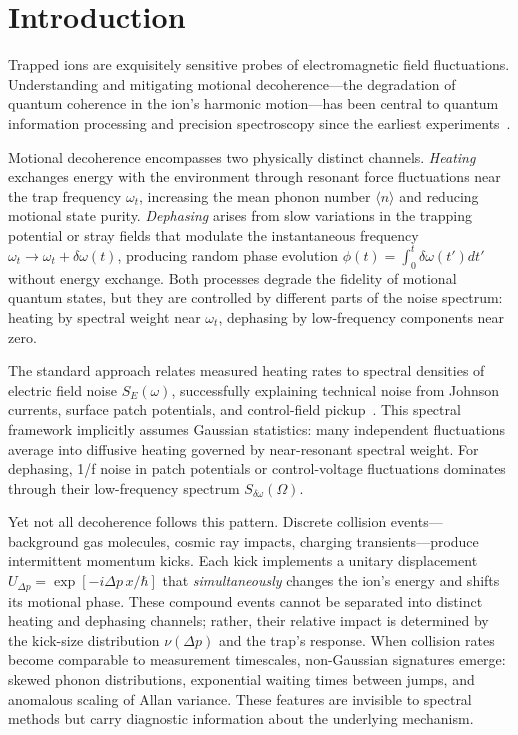\section{Introduction}

Trapped ions are exquisitely sensitive probes of electromagnetic field fluctuations. Understanding and mitigating motional decoherence—the degradation of quantum coherence in the ion's harmonic motion—has been central to quantum information processing and precision spectroscopy since the earliest experiments~\cite{Turchette2000,Wineland1998}. 

Motional decoherence encompasses two physically distinct channels. \emph{Heating} exchanges energy with the environment through resonant force fluctuations near the trap frequency $\omega_t$, increasing the mean phonon number $\langle n \rangle$ and reducing motional state purity. \emph{Dephasing} arises from slow variations in the trapping potential or stray fields that modulate the instantaneous frequency $\omega_t \to \omega_t + \delta\omega(t)$, producing random phase evolution $\phi(t) = \int_0^t \delta\omega(t') dt'$ without energy exchange. Both processes degrade the fidelity of motional quantum states, but they are controlled by different parts of the noise spectrum: heating by spectral weight near $\omega_t$, dephasing by low-frequency components near zero.

The standard approach relates measured heating rates to spectral densities of electric field noise $S_E(\omega)$, successfully explaining technical noise from Johnson currents, surface patch potentials, and control-field pickup~\cite{Brownnutt2015}. This spectral framework implicitly assumes Gaussian statistics: many independent fluctuations average into diffusive heating governed by near-resonant spectral weight. For dephasing, 1/f noise in patch potentials or control-voltage fluctuations dominates through their low-frequency spectrum $S_{\delta\omega}(\Omega)$.

Yet not all decoherence follows this pattern. Discrete collision events—background gas molecules, cosmic ray impacts, charging transients—produce intermittent momentum kicks. Each kick implements a unitary displacement $U_{\Delta p} = \exp[-i \Delta p \, x/\hbar]$ that \emph{simultaneously} changes the ion's energy and shifts its motional phase. These compound events cannot be separated into distinct heating and dephasing channels; rather, their relative impact is determined by the kick-size distribution $\nu(\Delta p)$ and the trap's response. When collision rates become comparable to measurement timescales, non-Gaussian signatures emerge: skewed phonon distributions, exponential waiting times between jumps, and anomalous scaling of Allan variance. These features are invisible to spectral methods but carry diagnostic information about the underlying mechanism.

